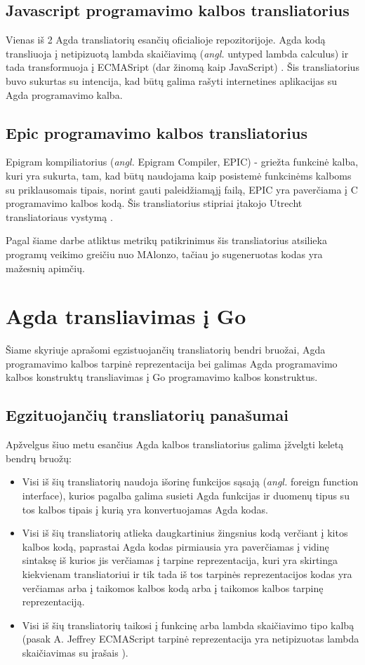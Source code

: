 \documentclass{VUMIFPSkursinis}
\begin{document}
\subsection{Javascript programavimo kalbos transliatorius}
Vienas iš 2 Agda transliatorių esančių oficialioje repozitorijoje. Agda kodą transliuoja į netipizuotą lambda skaičiavimą (\textit{angl.} untyped lambda calculus) ir tada transformuoja į ECMASript (dar žinomą kaip JavaScript) \cite{html_agda}. Šis transliatorius buvo sukurtas su intencija, kad būtų galima rašyti internetines aplikacijas su Agda programavimo kalba.
\subsection{Epic programavimo kalbos transliatorius}
Epigram kompiliatorius (\textit{angl.} Epigram Compiler, EPIC) - griežta funkcinė kalba, kuri yra sukurta, tam, kad būtų naudojama kaip posistemė funkcinėms kalboms su priklausomais tipais, norint gauti paleidžiamąjį failą, EPIC yra paverčiama į C programavimo kalbos kodą. Šis transliatorius stipriai įtakojo Utrecht transliatoriaus vystymą \cite{Utrecht}.\par Pagal šiame darbe atliktus metrikų patikrinimus šis transliatorius atsilieka programų veikimo greičiu nuo MAlonzo, tačiau jo sugeneruotas kodas yra mažesnių apimčių. 
\section{Agda transliavimas į Go}
Šiame skyriuje aprašomi egzistuojančių transliatorių bendri bruožai, Agda programavimo kalbos tarpinė reprezentacija bei galimas Agda programavimo kalbos konstruktų transliavimas į Go programavimo kalbos konstruktus.
\subsection{Egzituojančių transliatorių panašumai}
Apžvelgus šiuo metu esančius Agda kalbos transliatorius galima įžvelgti keletą bendrų bruožų:
\begin{itemize}
	\item Visi iš šių transliatorių naudoja išorinę funkcijos sąsają (\textit{angl.} foreign function interface), kurios pagalba galima susieti Agda funkcijas ir duomenų tipus su tos kalbos tipais į kurią yra konvertuojamas Agda kodas.
	\item Visi iš šių transliatorių atlieka daugkartinius žingsnius kodą verčiant į kitos kalbos kodą, paprastai Agda kodas pirmiausia yra paverčiamas į vidinę sintaksę iš kurios jis verčiamas į tarpine reprezentacija, kuri yra skirtinga kiekvienam transliatoriui ir tik tada iš tos tarpinės reprezentacijos kodas yra verčiamas arba į taikomos kalbos kodą arba į taikomos kalbos tarpinę reprezentaciją.
	\item Visi iš šių transliatorių taikosi į funkcinę arba lambda skaičiavimo tipo kalbą (pasak A. Jeffrey ECMAScript tarpinė reprezentacija yra netipizuotas lambda skaičiavimas su įrašais \cite{html_agda}).
\end{itemize}
\end{document}
